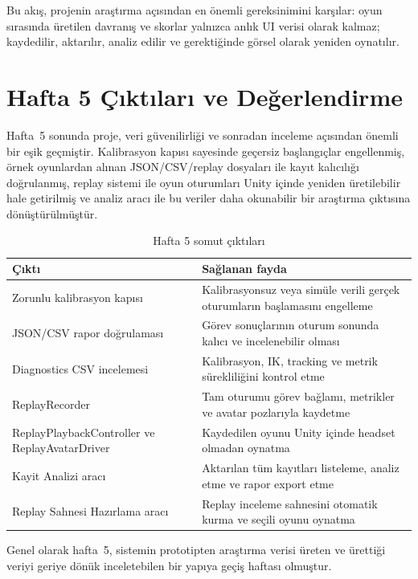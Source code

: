 \documentclass[11pt,a4paper]{article}
\begin{document}
Bu akış, projenin araştırma açısından en önemli gereksinimini karşılar:
oyun sırasında üretilen davranış ve skorlar yalnızca anlık UI verisi olarak
kalmaz; kaydedilir, aktarılır, analiz edilir ve gerektiğinde görsel olarak
yeniden oynatılır.

\section{Hafta 5 Çıktıları ve Değerlendirme}
\label{sec:sonuc}

Hafta~5 sonunda proje, veri güvenilirliği ve sonradan inceleme açısından önemli
bir eşik geçmiştir. Kalibrasyon kapısı sayesinde geçersiz başlangıçlar
engellenmiş, örnek oyunlardan alınan JSON/CSV/replay dosyaları ile kayıt
kalıcılığı doğrulanmış, replay sistemi ile oyun oturumları Unity içinde
yeniden üretilebilir hale getirilmiş ve analiz aracı ile bu veriler daha
okunabilir bir araştırma çıktısına dönüştürülmüştür.

\begin{table}[H]
\centering
\caption{Hafta 5 somut çıktıları}
\label{tab:week5_outputs}
\renewcommand{\arraystretch}{1.22}
\begin{tabularx}{\textwidth}{lX}
\toprule
\textbf{Çıktı} & \textbf{Sağlanan fayda} \\
\midrule
Zorunlu kalibrasyon kapısı & Kalibrasyonsuz veya simüle verili gerçek oturumların başlamasını engelleme \\
JSON/CSV rapor doğrulaması & Görev sonuçlarının oturum sonunda kalıcı ve incelenebilir olması \\
Diagnostics CSV incelemesi & Kalibrasyon, IK, tracking ve metrik sürekliliğini kontrol etme \\
ReplayRecorder & Tam oturumu görev bağlamı, metrikler ve avatar pozlarıyla kaydetme \\
ReplayPlaybackController ve ReplayAvatarDriver & Kaydedilen oyunu Unity içinde headset olmadan oynatma \\
Kayit Analizi aracı & Aktarılan tüm kayıtları listeleme, analiz etme ve rapor export etme \\
Replay Sahnesi Hazırlama aracı & Replay inceleme sahnesini otomatik kurma ve seçili oyunu oynatma \\
\bottomrule
\end{tabularx}
\end{table}

Genel olarak hafta~5, sistemin prototipten araştırma verisi üreten ve ürettiği
veriyi geriye dönük inceletebilen bir yapıya geçiş haftası olmuştur.
\end{document}
